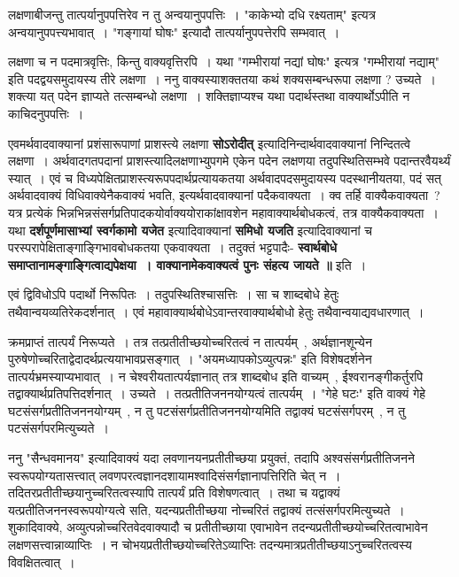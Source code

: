 	लक्षणाबीजन्तु तात्पर्यानुपपत्तिरेव न तु अन्वयानुपपत्तिः~। "काकेभ्यो दधि रक्ष्यताम्" इत्यत्र अन्वयानुपपत्त्यभावात्~। "गङ्गायां घोषः" इत्यादौ तात्पर्यानुपपत्तेरपि सम्भवात्~।\par
	लक्षणा च न पदमात्रवृत्तिः, किन्तु वाक्यवृत्तिरपि~। यथा "गम्भीरायां नद्यां घोषः" इत्यत्र "गम्भीरायां नद्याम्" इति पदद्वयसमुदायस्य तीरे लक्षणा~। ननु वाक्यस्याशक्ततया कथं शक्यसम्बन्धरूपा लक्षणा ? उच्यते~। शक्त्या यत् पदेन ज्ञाप्यते तत्सम्बन्धो लक्षणा~। शक्तिज्ञाप्यश्च यथा पदार्थस्तथा वाक्यार्थोऽपीति न काचिदनुपपत्तिः~।\par
	एवमर्थवादवाक्यानां प्रशंसारूपाणां प्राशस्त्ये लक्षणा {\bfseries सोऽरोदीत्} इत्यादिनिन्दार्थवादवाक्यानां निन्दितत्वे लक्षणा~। अर्थवादगतपदानां प्राशस्त्यादिलक्षणाभ्युपगमे एकेन पदेन लक्षणया तदुपस्थितिसम्भवे पदान्तरवैयर्थ्यं स्यात्~। एवं च विध्यपेक्षितप्राशस्त्यरूपपदार्थप्रत्यायकतया अर्थवादपदसमुदायस्य पदस्थानीयतया, पदं सत् अर्थवादवाक्यं विधिवाक्येनैकवाक्यं भवति, इत्यर्थवादवाक्यानां पदैकवाक्यता~। क्व तर्हि वाक्यैकवाक्यता~? यत्र प्रत्येकं भिन्नभिन्नसंसर्गप्रतिपादकयोर्वाक्ययोराकांक्षावशेन महावाक्यार्थबोधकत्वं, तत्र वाक्यैकवाक्यता~। यथा {\bfseries दर्शपूर्णमासाभ्यां स्वर्गकामो यजेत} इत्यादिवाक्यानां {\bfseries समिधो यजति} इत्यादिवाक्यानां च परस्परापेक्षिताङ्गाङ्गिभावबोधकतया एकवाक्यता~। तदुक्तं भट्टपादैः- {\bfseries स्वार्थबोधे समाप्तानामङ्गाङ्गित्वाद्यपेक्षया~। वाक्यानामेकवाक्यत्वं पुनः संहत्य जायते ॥} इति~।\par 
	एवं द्विविधोऽपि पदार्थो निरूपितः~। तदुपस्थितिश्चासत्तिः~। सा च शाब्दबोधे हेतुः तथैवान्वयव्यतिरेकदर्शनात्~। एवं महावाक्यार्थबोधेऽवान्तरवाक्यार्थबोधो हेतुः तथैवान्वयाद्यवधारणात्~।\par
	क्रमप्राप्तं तात्पर्यं निरूप्यते~। तत्र तत्प्रतीतीच्छयोच्चरितत्वं न तात्पर्यम्~, अर्थज्ञानशून्येन पुरुषेणोच्चरिताद्वेदादर्थप्रत्ययाभावप्रसङ्गात्~। "अयमध्यापकोऽव्युत्पन्नः" इति विशेषदर्शनेन तात्पर्यभ्रमस्याप्यभावात्~। न चेश्वरीयतात्पर्यज्ञानात् तत्र शाब्दबोध इति वाच्यम्~, ईश्वरानङ्गीकर्तुरपि तद्वाक्यार्थप्रतिपत्तिदर्शनात्~। उच्यते~। तत्प्रतीतिजननयोग्यत्वं तात्पर्यम्~। "गेहे घटः" इति वाक्यं गेहे घटसंसर्गप्रतीतिजननयोग्यम्~, न तु पटसंसर्गप्रतीतिजननयोग्यमिति तद्वाक्यं घटसंसर्गपरम्~, न तु पटसंसर्गपरमित्युच्यते~।\par
	ननु "सैन्धवमानय" इत्यादिवाक्यं यदा लवणानयनप्रतीतीच्छया प्रयुक्तं, तदापि अश्वसंसर्गप्रतीतिजनने स्वरूपयोग्यतासत्त्वात् लवणपरत्वज्ञानदशायामश्वादिसंसर्गज्ञानापत्तिरिति चेत् न~। तदितरप्रतीतीच्छयानुच्चरितत्वस्यापि तात्पर्यं प्रति विशेषणत्वात्~। तथा च यद्वाक्यं यत्प्रतीतिजननस्वरूपयोग्यत्वे सति, यदन्यप्रतीतीच्छया नोच्चरितं तद्वाक्यं तत्संसर्गपरमित्युच्यते~। शुकादिवाक्ये, अव्युत्पन्नोच्चरितवेदवाक्यादौ च प्रतीतीच्छाया एवाभावेन तदन्यप्रतीतीच्छयोच्चरितत्वाभावेन लक्षणसत्त्वान्नाव्याप्तिः~। न चोभयप्रतीतीच्छयोच्चरितेऽव्याप्तिः तदन्यमात्रप्रतीतीच्छयाऽनुच्चरितत्वस्य विवक्षितत्वात्~।\par
